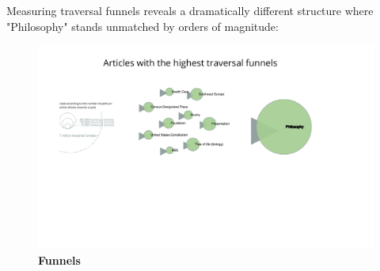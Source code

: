 \documentclass[pre,twocolumn,twoside,superscriptaddress,floatfix, aps, 10pt]{revtex4-1}
\begin{document}
Measuring traversal funnels reveals a dramatically different structure where "Philosophy" stands unmatched by orders of magnitude:

\begin{figure}[tp!]
  \centering	
  \includegraphics[width=\textwidth]{graphics/funnels.pdf}
  \caption{
    \textbf{Funnels}
  }
  \label{fig:Funnels}
\end{figure}
\end{document}
